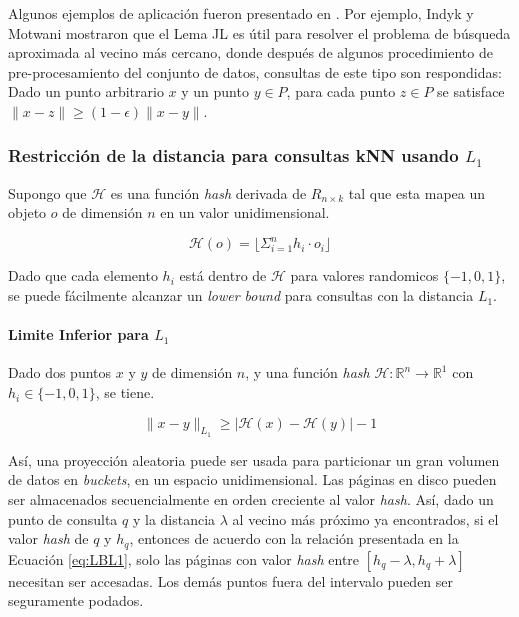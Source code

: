 Algunos ejemplos de aplicación fueron presentado en \cite{Indyk:1998:ANN:276698.276876}. Por ejemplo, Indyk y Motwani mostraron que el Lema JL es útil para resolver el problema de búsqueda aproximada al vecino más cercano, donde después de algunos procedimiento de pre-procesamiento del conjunto de datos, consultas de este tipo son respondidas: Dado un punto arbitrario $x$ y un punto $y \in P$, para cada punto $z \in P$ se satisface $ \|x - z\| \geq (1 - \epsilon)\|x - y\|$.

\subsubsection{Restricción de la distancia para consultas kNN usando $L_1$}

Supongo que  $\mathcal{H}$  es una función \textit{hash}  derivada de  $R_{n \times k}$   tal que esta mapea un objeto $o$
 de dimensión $n$ en un valor unidimensional.

\begin{equation}\label{eq:hashfile}
\mathcal{H}(o) = \lfloor \Sigma_{i=1}^n h_i \cdot o_i \rfloor
\end{equation}

Dado que cada elemento $h_i$  está dentro de $\mathcal{H}$  para valores randomicos $\{-1,0,1\}$,  se puede   fácilmente  alcanzar un \textit{lower bound} para consultas con la  distancia $L_1$.

\paragraph*{Limite Inferior para $L_1$} Dado dos puntos $x$ y $y$ de dimensión $n$, y una función  \textit{hash} $\mathcal{H} : \mathbb{R}^n \rightarrow \mathbb{R}^1$ con  $h_i \in \{-1,0,1\}$, se tiene.

\begin{equation}\label{eq:LBL1}
 \parallel x - y \parallel_{L_1} \geq | \mathcal{H}(x) - \mathcal{H}(y) | - 1
\end{equation}

Así, una proyección aleatoria puede ser usada para particionar un gran volumen de datos en \textit{buckets}, en un espacio unidimensional. Las páginas en disco pueden ser almacenados secuencialmente en orden creciente al valor \textit{hash}. Así, dado un punto de consulta $q$ y la distancia $\lambda$ al vecino más próximo ya encontrados, si el valor \textit{hash} de $q$ y $h_q$, entonces de acuerdo con la relación presentada en la Ecuación \ref{eq:LBL1}, solo las páginas con valor \textit{hash} entre $[ h_q - \lambda, h_q + \lambda]$ necesitan ser accesadas. Los demás puntos fuera del intervalo pueden ser seguramente podados.


